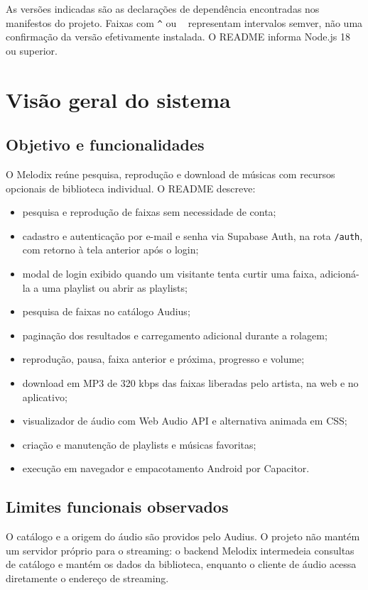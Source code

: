\documentclass[12pt,a4paper,oneside]{report}
\begin{document}
As versões indicadas são as declarações de dependência encontradas nos manifestos do projeto. Faixas com \texttt{\string^} ou \texttt{\string~} representam intervalos semver, não uma confirmação da versão efetivamente instalada. O README informa Node.js 18 ou superior.

\chapter{Visão geral do sistema}
\section{Objetivo e funcionalidades}
O Melodix reúne pesquisa, reprodução e download de músicas com recursos opcionais de biblioteca individual. O README descreve:
\begin{itemize}
\item pesquisa e reprodução de faixas sem necessidade de conta;
\item cadastro e autenticação por e-mail e senha via Supabase Auth, na rota \texttt{/auth}, com retorno à tela anterior após o login;
\item modal de login exibido quando um visitante tenta curtir uma faixa, adicioná-la a uma playlist ou abrir as playlists;
\item pesquisa de faixas no catálogo Audius;
\item paginação dos resultados e carregamento adicional durante a rolagem;
\item reprodução, pausa, faixa anterior e próxima, progresso e volume;
\item download em MP3 de 320 kbps das faixas liberadas pelo artista, na web e no aplicativo;
\item visualizador de áudio com Web Audio API e alternativa animada em CSS;
\item criação e manutenção de playlists e músicas favoritas;
\item execução em navegador e empacotamento Android por Capacitor.
\end{itemize}

\section{Limites funcionais observados}
O catálogo e a origem do áudio são providos pelo Audius. O projeto não mantém um servidor próprio para o streaming: o backend Melodix intermedeia consultas de catálogo e mantém os dados da biblioteca, enquanto o cliente de áudio acessa diretamente o endereço de streaming.
\end{document}
